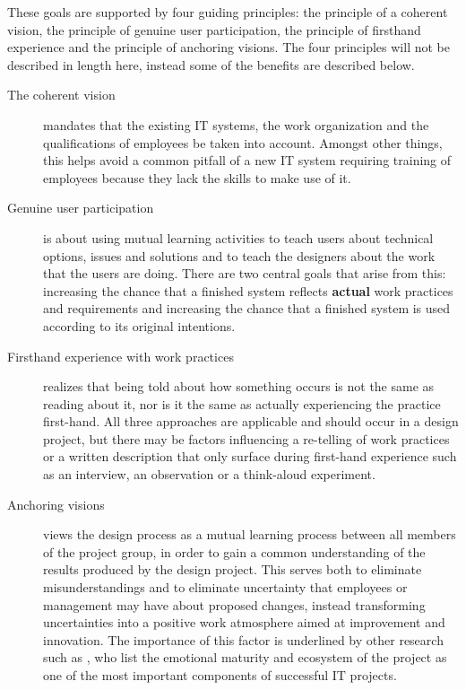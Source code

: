 These goals are supported by four guiding principles: the principle of a coherent 
vision, the principle of genuine user participation, the principle of firsthand
experience and the principle of anchoring visions. The four principles will not
be described in length here, instead some of the benefits are described below.

\begin{description}
    \item [The coherent vision] mandates that the existing IT systems, the work organization 
        and the qualifications of employees be taken into account. Amongst other things, 
        this helps avoid a common pitfall of a new IT system requiring training of employees 
        because they lack the skills to make use of it. 
    \item [Genuine user participation] is about using mutual learning activities
        to teach users about technical options, issues and solutions and to
        teach the designers about the work that the users are doing. There are
        two central goals that arise from this: increasing the chance that a
        finished system reflects \textbf{actual} work practices and
        requirements and increasing the chance that a finished system is used
        according to its original intentions.
    \item [Firsthand experience with work practices] realizes that being told
        about how something occurs is not the same as reading about it, nor is
        it the same as actually experiencing the practice first-hand. All three
        approaches are applicable and should occur in a design project, but
        there may be factors influencing a re-telling of work practices or a
        written description that only surface during first-hand experience such
        as an interview, an observation or a think-aloud experiment.
    \item [Anchoring visions] views the design process as a mutual learning
        process between all members of the project group, in order to gain a
        common understanding of the results produced by the design
        project\cite{bodker2004participatory}. This serves both to eliminate
        misunderstandings and to eliminate uncertainty that employees or management
        may have about proposed changes, instead transforming uncertainties into
        a positive work atmosphere aimed at improvement and innovation. The
        importance of this factor is underlined by other research such as
        \cite{standish20012}, who list the emotional maturity and ecosystem of
        the project as one of the most important components of successful IT
        projects.
\end{description}

